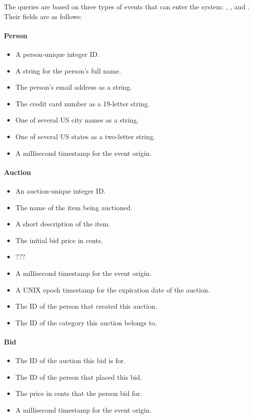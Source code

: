 The queries are based on three types of events that can enter the system: , , and . Their fields are as follows:

\paragraph{Person}
\begin{itemize}
\item {} A person-unique integer ID.
\item {} A string for the person's full name.
\item {} The person's email address as a string.
\item {} The credit card number as a 19-letter string.
\item {} One of several US city names as a string.
\item {} One of several US states as a two-letter string.
\item {} A millisecond timestamp for the event origin.
\end{itemize}

\paragraph{Auction}
\begin{itemize}
\item {} An auction-unique integer ID.
\item {} The name of the item being auctioned.
\item {} A short description of the item.
\item {} The initial bid price in cents.
\item {} ???
\item {} A millisecond timestamp for the event origin.
\item {} A UNIX epoch timestamp for the expiration date of the auction.
\item {} The ID of the person that created this auction.
\item {} The ID of the category this auction belongs to.
\end{itemize}

\paragraph{Bid}
\begin{itemize}
\item {} The ID of the auction this bid is for.
\item {} The ID of the person that placed this bid.
\item {} The price in cents that the person bid for.
\item {} A millisecond timestamp for the event origin.
\end{itemize}

